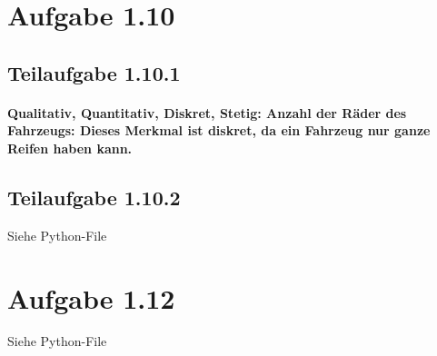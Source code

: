 \documentclass[a4paper,12pt]{article}
\begin{document}
	\section*{Aufgabe 1.10}
	\subsection*{Teilaufgabe 1.10.1}
	\paragraph{\textbf{Qualitativ, Quantitativ, Diskret, Stetig:} Anzahl der Räder des Fahrzeugs: Dieses Merkmal ist \textbf{diskret}, da ein Fahrzeug nur ganze Reifen haben kann.}
	\subsection*{Teilaufgabe 1.10.2}
	Siehe Python-File
	\section*{Aufgabe 1.12}
	Siehe Python-File
	
\end{document}
